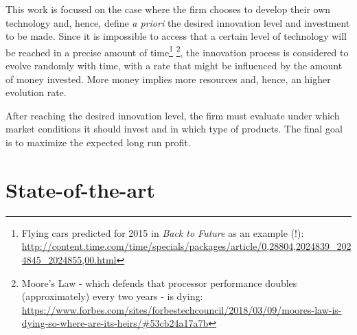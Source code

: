 This work is focused on the case where the firm chooses to develop their own technology and, hence, define \textit{a priori} the desired innovation level and investment to be made. Since it is impossible to access that a certain level of technology will be reached in a precise amount of time\footnote{Flying cars predicted for 2015 in \textit{Back to Future} as an example (!):\\  \url{http://content.time.com/time/specials/packages/article/0,28804,2024839_2024845_2024855,00.html}} \footnote{Moore's Law - which defends that processor performance doubles (approximately) every two years - is dying:\\
\url{https://www.forbes.com/sites/forbestechcouncil/2018/03/09/moores-law-is-dying-so-where-are-its-heirs/\#53cb24a17a7b}}, the innovation process is considered to evolve randomly with time, with a rate that might be influenced by the amount of money invested. More money implies more resources and, hence, an higher evolution rate.

After %
reaching the desired innovation level, the firm must evaluate under which market conditions it should invest and in which type of products. The final goal is to maximize the expected long run profit.






\section{State-of-the-art}


